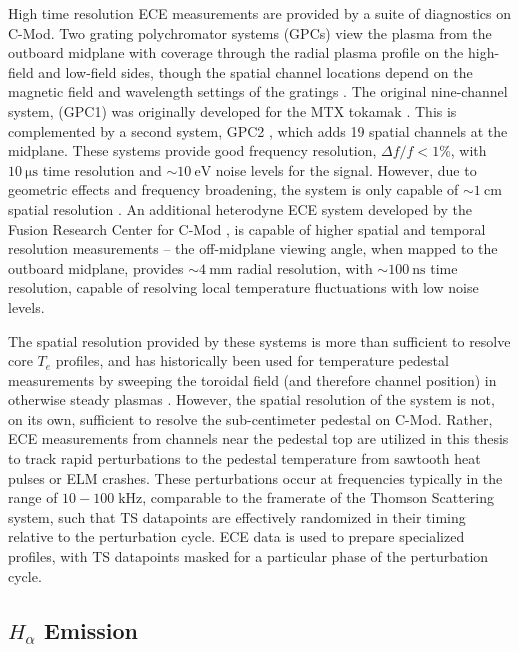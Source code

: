 High time resolution ECE measurements are provided by a suite of diagnostics on C-Mod.  Two grating polychromator systems (GPCs) view the plasma from the outboard midplane with coverage through the radial plasma profile on the high-field and low-field sides, though the spatial channel locations depend on the magnetic field and wavelength settings of the gratings \cite{Basse2007}.  The original nine-channel system, (GPC1) was originally developed for the MTX tokamak \cite{Guharay1990}.  This is complemented by a second system, GPC2 \cite{Taylor1998}, which adds 19 spatial channels at the midplane.  These systems provide good frequency resolution, $\Delta f/f < 1\%$, with $\SI{10}{\micro\second}$ time resolution and $\sim \SI{10}{\electronvolt}$ noise levels for the signal.  However, due to geometric effects and frequency broadening, the system is only capable of $\sim \SI{1}{\centi\meter}$ spatial resolution \cite{Basse2007}.  An additional heterodyne ECE system developed by the Fusion Research Center for C-Mod \cite{Heard1999,Chatterjee2001}, is capable of higher spatial and temporal resolution measurements -- the off-midplane viewing angle, when mapped to the outboard midplane, provides $\sim \SI{4}{\milli\meter}$ radial resolution, with $\sim \SI{100}{\nano\second}$ time resolution, capable of resolving local temperature fluctuations with low noise levels.

The spatial resolution provided by these systems is more than sufficient to resolve core $T_e$ profiles, and has historically been used for temperature pedestal measurements by sweeping the toroidal field (and therefore channel position) in otherwise steady plasmas \cite{Hubbard2001}.  However, the spatial resolution of the system is not, on its own, sufficient to resolve the sub-centimeter pedestal on C-Mod.  Rather, ECE measurements from channels near the pedestal top are utilized in this thesis to track rapid perturbations to the pedestal temperature from sawtooth heat pulses or ELM crashes.  These perturbations occur at frequencies typically in the range of $10-100 \;\si{\kilo\hertz}$, comparable to the framerate of the Thomson Scattering system, such that TS datapoints are effectively randomized in their timing relative to the perturbation cycle.  ECE data is used to prepare specialized profiles, with TS datapoints masked for a particular phase of the perturbation cycle.

\subsection{$H_\alpha$ Emission}\label{subsec:app_halpha}

